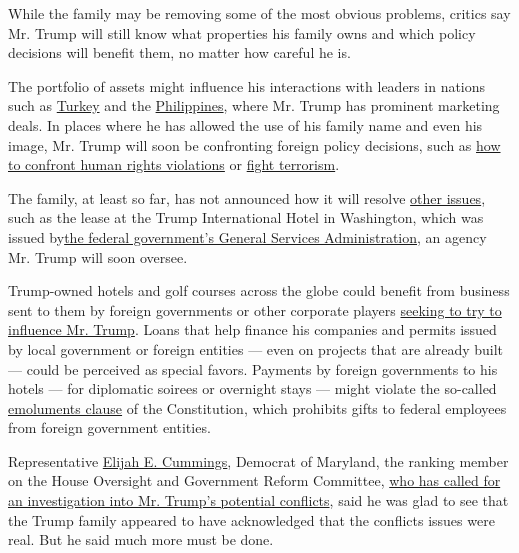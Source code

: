 While the family may be removing some of the most obvious problems,
critics say Mr. Trump will still know what properties his family owns
and which policy decisions will benefit them, no matter how careful he
is.

The portfolio of assets might influence his interactions with leaders in
nations such as
\href{http://www.trump.com/real-estate-portfolio/istanbul/trump-towers/}{Turkey}
and the \href{http://www.trumptowerphilippines.com/}{Philippines}, where
Mr. Trump has prominent marketing deals. In places where he has allowed
the use of his family name and even his image, Mr. Trump will soon be
confronting foreign policy decisions, such as
\href{http://www.nytimes.com/interactive/2016/12/07/world/asia/rodrigo-duterte-philippines-drugs-killings.html}{how
to confront human rights violations} or
\href{http://www.nytimes.com/2016/06/30/world/middleeast/turkeys-twin-terrorist-threats-explained.html}{fight
terrorism}.

The family, at least so far, has not announced how it will resolve
\href{http://www.nytimes.com/2016/12/14/us/politics/donald-trump-transition.html}{other
issues}, such as the lease at the Trump International Hotel in
Washington, which was issued
by\href{https://www.gsa.gov/portal/content/172963}{the federal
government's General Services Administration}, an agency Mr. Trump will
soon oversee.

Trump-owned hotels and golf courses across the globe could benefit from
business sent to them by foreign governments or other corporate players
\href{https://www.washingtonpost.com/business/capitalbusiness/2016/11/18/9da9c572-ad18-11e6-977a-1030f822fc35_story.html?utm_term=.5b25e43dbde9}{seeking
to try to influence Mr. Trump}. Loans that help finance his companies
and permits issued by local government or foreign entities --- even on
projects that are already built --- could be perceived as special
favors. Payments by foreign governments to his hotels --- for diplomatic
soirees or overnight stays --- might violate the so-called
\href{https://www.brookings.edu/research/the-emoluments-clause-its-text-meaning-and-application-to-donald-j-trump/}{emoluments
clause} of the Constitution, which prohibits gifts to federal employees
from foreign government entities.

Representative \href{https://cummings.house.gov/}{Elijah E. Cummings},
Democrat of Maryland, the ranking member on the House Oversight and
Government Reform Committee,
\href{http://www.warren.senate.gov/files/documents/2016-11-23-GAO_Letter_On_Trump_Transition.pdf}{who
has called for an investigation into Mr. Trump's potential conflicts},
said he was glad to see that the Trump family appeared to have
acknowledged that the conflicts issues were real. But he said much more
must be done.

